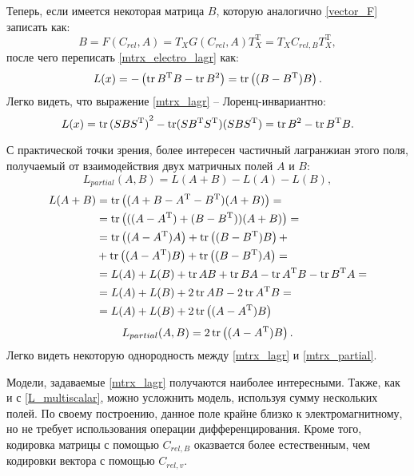 Теперь, если имеется некоторая матрица $B$, которую аналогично \ref{vector_F} записать как:
\begin{equation}
	B = F(C_{rel}, A) = T_XG(C_{rel}, A)T_X^\mathrm{T} = T_XC_{rel, B}T_X^\mathrm{T},
	\label{mtrx_F}
\end{equation}
после чего переписать \ref{mtrx_electro_lagr} как:
\begin{equation}
	L(x) = -\left(\operatorname{tr} B^\mathrm{T}B - \operatorname{tr} B^2\right) = \operatorname{tr}\left((B - B^\mathrm{T})B\right).
	\label{mtrx_lagr}
\end{equation}
Легко видеть, что выражение \ref{mtrx_lagr} -- Лоренц-инвариантно:
\begin{equation}
	L(x) = \operatorname{tr} {(SBS^\mathrm{T})}^2 - \operatorname{tr} (SB^\mathrm{T}S^\mathrm{T})(SBS^\mathrm{T}) = \operatorname{tr} B^2 - \operatorname{tr} B^\mathrm{T}B.
	\label{mtrx_lagr_invar}
\end{equation}

С практической точки зрения, более интересен частичный лагранжиан этого поля, получаемый от взаимодействия двух матричных полей $A$ и $B$:
\begin{equation}
	L_{partial}(A, B) = L(A + B) - L(A) - L(B),
	\label{mtrx_partial0}
\end{equation}
\begin{align}
	L(A + B) &= \operatorname{tr}\left((A + B - A^\mathrm{T} - B^\mathrm{T})(A + B)\right) = \notag \\
			 &= \operatorname{tr}\left(((A - A^\mathrm{T}) + (B - B^\mathrm{T}))(A + B)\right) = \notag \\
			 &= \operatorname{tr}\left((A - A^\mathrm{T})A\right) + \operatorname{tr}\left((B - B^\mathrm{T})B\right) + \notag \\
			 &+ \operatorname{tr}\left((A - A^\mathrm{T})B\right) + \operatorname{tr}\left((B - B^\mathrm{T})A\right) = \notag \\
			 &= L(A) + L(B) + \operatorname{tr} AB + \operatorname{tr} BA - \operatorname{tr} A^\mathrm{T}B - \operatorname{tr} B^\mathrm{T}A = \notag \\
			 &= L(A) + L(B) + 2\operatorname{tr} AB - 2\operatorname{tr} A^\mathrm{T}B = \notag \\
			 &= L(A) + L(B) +2\operatorname{tr}\left((A - A^\mathrm{T})B\right)
	\label{mtrx_partial1}
\end{align}
\begin{equation}
	L_{partial}(A, B) = 2\operatorname{tr}\left((A - A^\mathrm{T})B\right).
	\label{mtrx_partial}
\end{equation}
Легко видеть некоторую однородность между \ref{mtrx_lagr} и \ref{mtrx_partial}. 

Модели, задаваемые \ref{mtrx_lagr} получаются наиболее интересными. Также, как и с \ref{L_multiscalar}, можно усложнить модель, используя сумму нескольких полей. По своему построению, данное поле крайне близко к электромагнитному, но не требует использования операции дифференцирования. Кроме того, кодировка матрицы с помощью  $C_{rel, B}$ оказвается более естественным, чем кодировки вектора с помощью $C_{rel, v}$.

